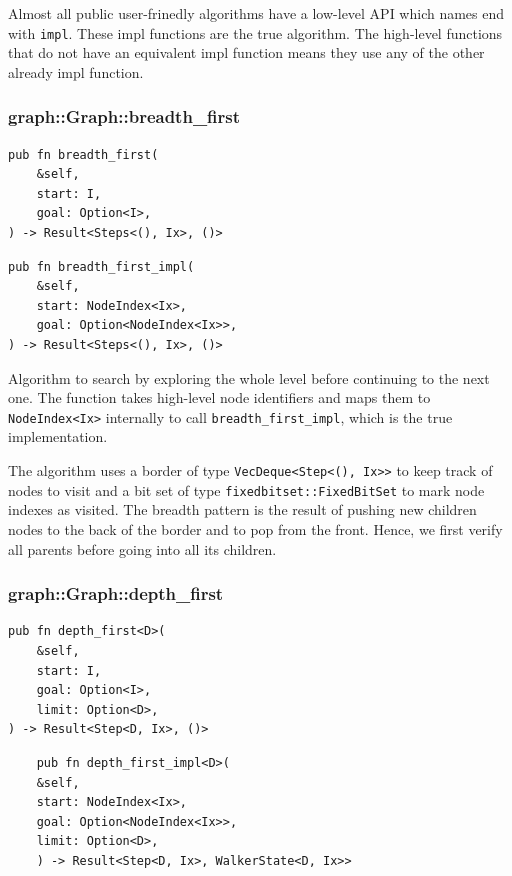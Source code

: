 Almost all public user-frinedly algorithms have a low-level API which names end with \texttt{impl}. These
impl functions are the true algorithm. The high-level functions that do not have an equivalent impl function
means they use any of the other already impl function.

\subsubsection{graph::Graph::breadth\_first}
\begin{verbatim}
pub fn breadth_first(
    &self,
    start: I,
    goal: Option<I>,
) -> Result<Steps<(), Ix>, ()>
\end{verbatim}

\begin{verbatim}
pub fn breadth_first_impl(
    &self,
    start: NodeIndex<Ix>,
    goal: Option<NodeIndex<Ix>>,
) -> Result<Steps<(), Ix>, ()>
\end{verbatim}

Algorithm to search by exploring the whole level before continuing to the next one.
The function takes high-level node identifiers and maps them to \texttt{NodeIndex<Ix>} internally to
call \texttt{breadth\_first\_impl}, which is the true implementation.

The algorithm uses a border of type \texttt{VecDeque<Step<(), Ix>>} to keep track of nodes to visit and
a bit set of type \texttt{fixedbitset::FixedBitSet} to mark node indexes as visited.
The breadth pattern is the result of pushing new children nodes to the back of the border
and to pop from the front. Hence, we first verify all parents before going into all its children.


\subsubsection{graph::Graph::depth\_first}
\begin{verbatim}
pub fn depth_first<D>(
    &self,
    start: I,
    goal: Option<I>,
    limit: Option<D>,
) -> Result<Step<D, Ix>, ()>
\end{verbatim}

\begin{verbatim}
    pub fn depth_first_impl<D>(
    &self,
    start: NodeIndex<Ix>,
    goal: Option<NodeIndex<Ix>>,
    limit: Option<D>,
    ) -> Result<Step<D, Ix>, WalkerState<D, Ix>>
\end{verbatim}


